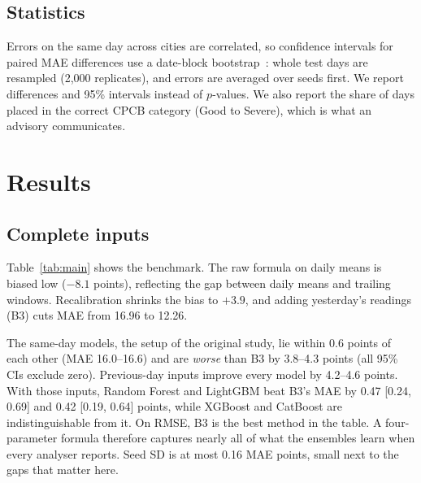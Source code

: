 \documentclass[conference]{IEEEtran}
\begin{document}
\subsection{Statistics}
Errors on the same day across cities are correlated, so confidence intervals for paired MAE
differences use a date-block bootstrap~\cite{kunsch1989bootstrap}: whole test days are
resampled (2,000 replicates), and errors are averaged over seeds first. We report
differences and 95\% intervals instead of $p$-values. We also report the share of days placed
in the correct CPCB category (Good to Severe), which is what an advisory communicates.

\section{Results}
\subsection{Complete inputs}\label{sec:complete}
Table~\ref{tab:main} shows the benchmark. The raw formula on daily means is biased low
($-8.1$ points), reflecting the gap between daily means and trailing windows. Recalibration
shrinks the bias to $+3.9$, and adding yesterday's readings (B3) cuts MAE from 16.96 to 12.26.

The same-day models, the setup of the original study, lie within 0.6 points of each other
(MAE 16.0--16.6) and are \emph{worse} than B3 by 3.8--4.3 points (all 95\% CIs exclude zero).
Previous-day inputs improve every model by 4.2--4.6 points. With those inputs, Random Forest
and LightGBM beat B3's MAE by 0.47 [0.24, 0.69] and 0.42 [0.19, 0.64] points, while XGBoost
and CatBoost are indistinguishable from it. On RMSE, B3 is the best method in the table. A
four-parameter formula therefore captures nearly all of what the ensembles learn when every
analyser reports. Seed SD is at most 0.16 MAE points,
small next to the gaps that matter here.
\end{document}
